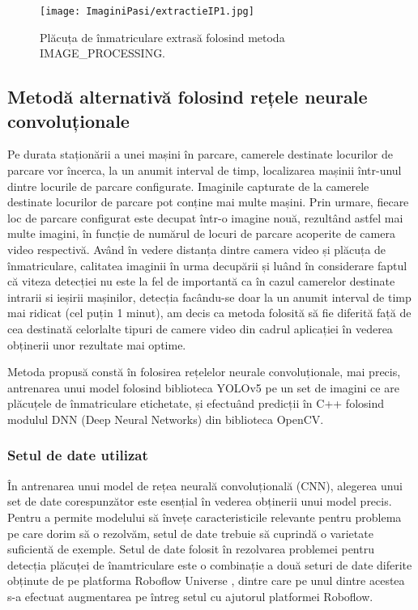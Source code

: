 \documentclass[12pt]{article}
\begin{document}
\begin{figure}[H]
  \centering
  \texttt{[image: ImaginiPasi/extractieIP1.jpg]}
  \caption{Pl\u{a}cuța de \^{i}nmatriculare extras\u{a} folosind metoda IMAGE\_PROCESSING.}
  \label{fig:extractie_placuta_opencv}
\end{figure}

\subsection{Metod\u{a} alternativ\u{a} folosind rețele neurale convoluționale}

Pe durata stațion\u{a}rii a unei mașini \^{i}n parcare, camerele destinate locurilor de parcare vor \^{i}ncerca, la un anumit interval de timp, localizarea mașinii \^{i}ntr-unul dintre locurile de parcare configurate. Imaginile capturate de la camerele destinate locurilor de parcare pot conține mai multe mașini. Prin urmare, fiecare loc de parcare configurat este decupat \^{i}ntr-o imagine nou\u{a}, rezult\^{a}nd astfel mai multe imagini, \^{i}n funcție de num\u{a}rul de locuri de parcare acoperite de camera video respectiv\u{a}. Av\^{a}nd \^{i}n vedere distanța dintre camera video și pl\u{a}cuța de \^{i}nmatriculare, calitatea imaginii \^{i}n urma decup\u{a}rii și lu\^{a}nd \^{i}n considerare faptul c\u{a} viteza detecției nu este la fel de important\u{a} ca \^{i}n cazul camerelor destinate intrarii si ieșirii mașinilor, detecția fac\^{a}ndu-se doar la un anumit interval de timp mai ridicat (cel puțin 1 minut), am decis ca metoda folosit\u{a} s\u{a} fie diferit\u{a} faț\u{a} de cea destinat\u{a} celorlalte tipuri de camere video din cadrul aplicației \^{i}n vederea obținerii unor rezultate mai optime. 

Metoda propus\u{a} const\u{a} \^{i}n folosirea rețelelor neurale convoluționale, mai precis, antrenarea unui model folosind biblioteca YOLOv5 pe un set de imagini ce are pl\u{a}cuțele de \^{i}nmatriculare etichetate, și efectu\^{a}nd predicții \^{i}n C++ folosind modulul DNN (Deep Neural Networks) din biblioteca OpenCV.


\subsubsection{Setul de date utilizat}

\^{I}n antrenarea unui model de rețea neural\u{a} convoluțional\u{a} (CNN), alegerea unui set de date corespunz\u{a}tor este esențial \^{i}n vederea obținerii unui model precis. Pentru a permite modelului s\u{a} \^{i}nvețe caracteristicile relevante pentru problema pe care dorim s\u{a} o rezolv\u{a}m, setul de date trebuie s\u{a} cuprind\u{a} o varietate suficient\u{a} de exemple. Setul de date folosit \^{i}n rezolvarea problemei pentru detecția pl\u{a}cuței de \^{i}namtriculare este o combinație a dou\u{a} seturi de date diferite obținute de pe platforma Roboflow Universe \cite{roboflowuniverse}, dintre care pe unul dintre acestea s-a efectuat augmentarea pe \^{i}ntreg setul cu ajutorul platformei Roboflow.
\end{document}
